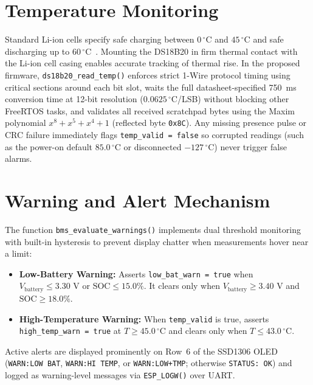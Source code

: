 \documentclass[12pt,a4paper]{article}
\begin{document}
\section{Temperature Monitoring}
\label{sec:temp_monitoring}

Standard Li-ion cells specify safe charging between $0\,^\circ\text{C}$ and $45\,^\circ\text{C}$ and safe discharging up to $60\,^\circ\text{C}$~\cite{reddy_linden}. Mounting the DS18B20 in firm thermal contact with the Li-ion cell casing enables accurate tracking of thermal rise. In the proposed firmware, \texttt{ds18b20\_read\_temp()} enforces strict 1-Wire protocol timing using critical sections around each bit slot, waits the full datasheet-specified 750~ms conversion time at 12-bit resolution ($0.0625\,^\circ\text{C}$/LSB) without blocking other FreeRTOS tasks, and validates all received scratchpad bytes using the Maxim polynomial $x^8 + x^5 + x^4 + 1$ (reflected byte \texttt{0x8C}). Any missing presence pulse or CRC failure immediately flags \texttt{temp\_valid = false} so corrupted readings (such as the power-on default $85.0\,^\circ\text{C}$ or disconnected $-127\,^\circ\text{C}$) never trigger false alarms.

\section{Warning and Alert Mechanism}
\label{sec:warnings}

The function \texttt{bms\_evaluate\_warnings()} implements dual threshold monitoring with built-in hysteresis to prevent display chatter when measurements hover near a limit:
\begin{itemize}
    \item \textbf{Low-Battery Warning:} Asserts \texttt{low\_bat\_warn = true} when $V_{\text{battery}} \le 3.30\text{ V}$ or $\text{SOC} \le 15.0\%$. It clears only when $V_{\text{battery}} \ge 3.40\text{ V}$ and $\text{SOC} \ge 18.0\%$.
    \item \textbf{High-Temperature Warning:} When \texttt{temp\_valid} is true, asserts \texttt{high\_temp\_warn = true} at $T \ge 45.0\,^\circ\text{C}$ and clears only when $T \le 43.0\,^\circ\text{C}$.
\end{itemize}
Active alerts are displayed prominently on Row~6 of the SSD1306 OLED (\texttt{WARN:LOW BAT}, \texttt{WARN:HI TEMP}, or \texttt{WARN:LOW+TMP}; otherwise \texttt{STATUS: OK}) and logged as warning-level messages via \texttt{ESP\_LOGW()} over UART.
\end{document}
